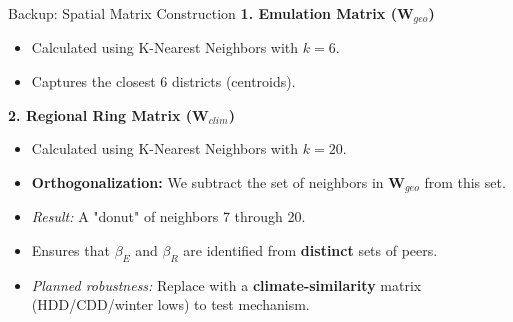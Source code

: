 \documentclass[10pt]{beamer}
\begin{document}
\begin{frame}[label=backup_spatial]{Backup: Spatial Matrix Construction}
    \textbf{1. Emulation Matrix ($\mathbf{W}_{geo}$)}
    \begin{itemize}
        \item Calculated using K-Nearest Neighbors with $k=6$.
        \item Captures the closest 6 districts (centroids).
    \end{itemize}
    
    \vspace{1em}
    \textbf{2. Regional Ring Matrix ($\mathbf{W}_{clim}$)}
    \begin{itemize}
        \item Calculated using K-Nearest Neighbors with $k=20$.
        \item \textbf{Orthogonalization:} We subtract the set of neighbors in $\mathbf{W}_{geo}$ from this set.
        \item \textit{Result:} A "donut" of neighbors 7 through 20.
        \item Ensures that $\beta_E$ and $\beta_R$ are identified from \textbf{distinct} sets of peers.
        \item \emph{Planned robustness:} Replace with a \textbf{climate-similarity} matrix (HDD/CDD/winter lows) to test mechanism.
    \end{itemize}
    
    \vspace{1em}
    \hyperlink{main_results}{}
\end{frame}
\end{document}
